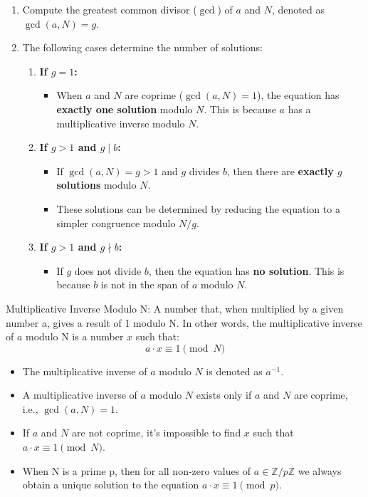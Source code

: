 \begin{enumerate}
    \item Compute the greatest common divisor (\(\gcd\)) of \(a\) and \(N\), denoted as \(\gcd(a, N) = g\).
    \item The following cases determine the number of solutions:
    \begin{enumerate}
        \item \textbf{If \(g = 1\):}
        \begin{itemize}
            \item When \(a\) and \(N\) are coprime (\(\gcd(a, N) = 1\)), the equation has \textbf{exactly one solution} modulo \(N\). This is because \(a\) has a multiplicative inverse modulo \(N\).
        \end{itemize}
        
        \item \textbf{If \(g > 1\) and \(g \mid b\):}
        \begin{itemize}
            \item If \(\gcd(a, N) = g > 1\) and \(g\) divides \(b\), then there are \textbf{exactly \(g\) solutions} modulo \(N\).
            \item These solutions can be determined by reducing the equation to a simpler congruence modulo \(N/g\).
        \end{itemize}
        
        \item \textbf{If \(g > 1\) and \(g \nmid b\):}
        \begin{itemize}
            \item If \(g\) does not divide \(b\), then the equation has \textbf{no solution}. This is because \(b\) is not in the span of \(a\) modulo \(N\).
        \end{itemize}
    \end{enumerate}
\end{enumerate}

\begin{defn}
    Multiplicative Inverse Modulo N: A number that, when multiplied by a given number a, gives a result of 1 modulo N. In other words, the multiplicative inverse of \(a \) modulo N is a number \(x \) such that:
    \[ a \cdot x \equiv 1 \pmod{N} \]

    \begin{itemize}
        \item The multiplicative inverse of \(a\) modulo \(N\) is denoted as \(a^{-1}\).
        \item A multiplicative inverse of \(a\) modulo \(N\) exists only if \(a\) and \(N\) are coprime, i.e., \(\gcd(a, N) = 1\).

        \item If \(a\) and \(N\) are not coprime, it’s impossible to find \(x\) such that
        \(
        a \cdot x \equiv 1 \pmod{N}.
        \)
        \item When N is a prime p, then for all non-zero values of \( a \in \mathbb{Z}/p\mathbb{Z} \) we always obtain a unique solution to the equation \( a \cdot x \equiv 1 \pmod{p} \).
        
    \end{itemize}
\end{defn}

